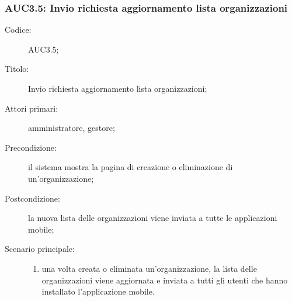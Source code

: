 \documentclass[../../../analisi-dei-requisiti.tex]{subfiles}
\begin{document}
\subsubsection{AUC3.5: Invio richiesta aggiornamento lista organizzazioni}%
\label{subs:AUC3.5}
\begin{description}
  \item[Codice:] AUC3.5;
  \item[Titolo:] Invio richiesta aggiornamento lista organizzazioni;
  \item[Attori primari:] amministratore, gestore;
  \item[Precondizione:] il sistema mostra la pagina di creazione o eliminazione di un'organizzazione;
  \item[Postcondizione:] la nuova lista delle organizzazioni viene inviata a tutte le applicazioni mobile;
  \item[Scenario principale:]
        \begin{enumerate}
          \item una volta creata o eliminata un'organizzazione, la lista delle organizzazioni viene aggiornata e inviata a tutti gli utenti che hanno installato l'applicazione mobile.
        \end{enumerate}
\end{description}
\end{document}
